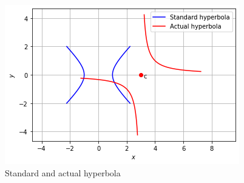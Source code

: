 \begin{figure}[!ht]
\centering
\includegraphics[width=\columnwidth]{solutions/su2021/2/78/Figure8.png}
\caption{Standard and actual hyperbola}
\label{quadform/78/fig:hyperbola}	
\end{figure}


